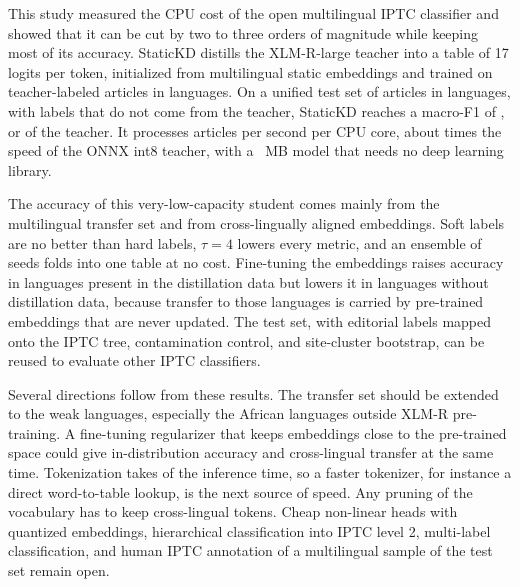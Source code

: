 This study measured the CPU cost of the open multilingual IPTC classifier and showed that it can be cut by two to three orders of magnitude while keeping most of its accuracy. StaticKD distills the XLM-R-large teacher into a table of 17 logits per token, initialized from multilingual static embeddings and trained on  teacher-labeled articles in  languages. On a unified test set of  articles in  languages, with labels that do not come from the teacher, StaticKD reaches a macro-F1 of , or  of the teacher. It processes  articles per second per CPU core, about  times the speed of the ONNX int8 teacher, with a ~MB model that needs no deep learning library.

The accuracy of this very-low-capacity student comes mainly from the multilingual transfer set and from cross-lingually aligned embeddings. Soft labels are no better than hard labels, $\tau=4$ lowers every metric, and an ensemble of seeds folds into one table at no cost. Fine-tuning the embeddings raises accuracy in languages present in the distillation data but lowers it in languages without distillation data, because transfer to those languages is carried by pre-trained embeddings that are never updated. The test set, with editorial labels mapped onto the IPTC tree, contamination control, and site-cluster bootstrap, can be reused to evaluate other IPTC classifiers.

Several directions follow from these results. The transfer set should be extended to the weak languages, especially the African languages outside XLM-R pre-training. A fine-tuning regularizer that keeps embeddings close to the pre-trained space could give in-distribution accuracy and cross-lingual transfer at the same time. Tokenization takes  of the inference time, so a faster tokenizer, for instance a direct word-to-table lookup, is the next source of speed. Any pruning of the vocabulary has to keep cross-lingual tokens. Cheap non-linear heads with quantized embeddings, hierarchical classification into IPTC level 2, multi-label classification, and human IPTC annotation of a multilingual sample of the test set remain open.
